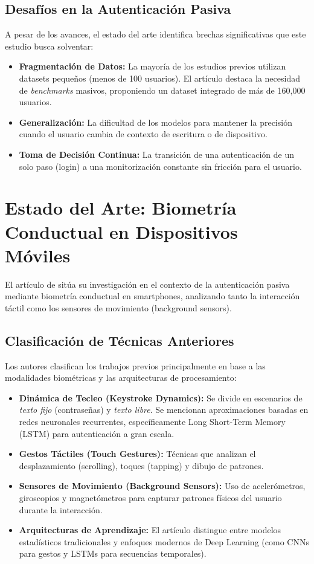 \subsection{Desafíos en la Autenticación Pasiva}
A pesar de los avances, el estado del arte identifica brechas significativas que este estudio busca solventar:
\begin{itemize}
    \item \textbf{Fragmentación de Datos:} La mayoría de los estudios previos utilizan datasets pequeños (menos de 100 usuarios). El artículo destaca la necesidad de \textit{benchmarks} masivos, proponiendo un dataset integrado de más de 160,000 usuarios.
    \item \textbf{Generalización:} La dificultad de los modelos para mantener la precisión cuando el usuario cambia de contexto de escritura o de dispositivo.
    \item \textbf{Toma de Decisión Continua:} La transición de una autenticación de un solo paso (login) a una monitorización constante sin fricción para el usuario.
\end{itemize}

\section*{Estado del Arte: Biometría Conductual en Dispositivos Móviles}

El artículo de \cite{Stragapede2022} sitúa su investigación en el contexto de la autenticación pasiva mediante biometría conductual en smartphones, analizando tanto la interacción táctil como los sensores de movimiento (background sensors).

\subsection*{Clasificación de Técnicas Anteriores}
Los autores clasifican los trabajos previos principalmente en base a las modalidades biométricas y las arquitecturas de procesamiento:
\begin{itemize}
    \item \textbf{Dinámica de Tecleo (Keystroke Dynamics):} Se divide en escenarios de \textit{texto fijo} (contraseñas) y \textit{texto libre}. Se mencionan aproximaciones basadas en redes neuronales recurrentes, específicamente Long Short-Term Memory (LSTM) para autenticación a gran escala.
    \item \textbf{Gestos Táctiles (Touch Gestures):} Técnicas que analizan el desplazamiento (scrolling), toques (tapping) y dibujo de patrones.
    \item \textbf{Sensores de Movimiento (Background Sensors):} Uso de acelerómetros, giroscopios y magnetómetros para capturar patrones físicos del usuario durante la interacción.
    \item \textbf{Arquitecturas de Aprendizaje:} El artículo distingue entre modelos estadísticos tradicionales y enfoques modernos de Deep Learning (como CNNs para gestos y LSTMs para secuencias temporales).
\end{itemize}

